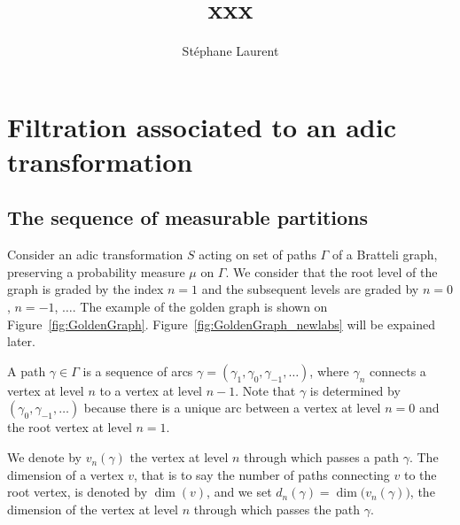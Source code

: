 \documentclass[12pt,a4paper]{article}
\author{Stéphane Laurent}
\title{xxx}
\begin{document}
\theoremstyle{defstyle}
\newtheorem{definition}{Definition}
\newtheorem{remark}{Remark}
\newtheorem{question}{Question}
\newtheorem{clarify}{To clarify}
\theoremstyle{thmstyle}
\newtheorem{thm}{Theorem}[section]
\newtheorem{ppsition}{Proposition}
\newtheorem{lemma}{Lemma}

\newcommand{\FF}{\mathcal{F}}
\newcommand{\GG}{\mathcal{G}}
\newcommand{\EE}{\mathbb{E}}
\newcommand{\II}{\mathcal{I}}
\newcommand{\LL}{\mathcal{L}}
\newcommand{\OO}{\mathcal{O}}
\newcommand{\XX}{\mathcal{X}}
\newcommand{\given}{\mid}
\newcommand{\eps}{\epsilon}
\newcommand{\indic}{\boldsymbol 1}
\newcommand{\Vb}{\boldsymbol V}


\maketitle

\section{Filtration associated to an adic transformation} 

\subsection{The sequence of measurable partitions}

Consider an adic transformation $S$ acting on set of paths $\Gamma$ of a 
Bratteli graph, preserving a probability measure $\mu$ on $\Gamma$. 
We consider that the root level of the graph is graded by the index 
$n=1$ and the subsequent levels are graded by $n=0$, $n=-1$, $\ldots$. 
The example of the golden graph is shown on Figure~\ref{fig:GoldenGraph}. 
Figure~\ref{fig:GoldenGraph_newlabs} will be expained later.

A path $\gamma \in \Gamma$ is a sequence of arcs 
$\gamma=(\gamma_{1}, \gamma_0, \gamma_{-1}, \ldots)$, where $\gamma_n$ connects 
a vertex at level $n$ to a vertex at level $n-1$. 
Note that $\gamma$ is determined by $(\gamma_0, \gamma_{-1}, \ldots)$ 
because there is a unique arc between a vertex at level $n=0$ and the root vertex 
at level $n=1$.  

We denote by $v_n(\gamma)$ the vertex at level $n$ through which passes a path $\gamma$. 
The dimension of a vertex $v$, that is to say the number of paths connecting $v$ 
to the root vertex, is denoted by $\dim(v)$, and we set 
$\boxed{d_n(\gamma)=\dim\bigl(v_n(\gamma)\bigr)}$, the dimension of the vertex at level $n$ 
through which passes the path $\gamma$. 
\end{document}
